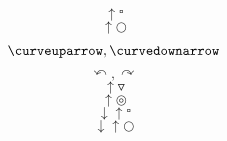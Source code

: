 \documentclass{jsarticle}
\begin{document}
\author{}
\date{}
\maketitle
 
   $$ \uparrow{\square} $$
   $$ \uparrow{\bigcirc}$$
   $$ \curveuparrow, \curvedownarrow $$
   $$ \curvearrowleft, \curvearrowright $$
   $$ \uparrow{\triangledown} $$
   $$ \uparrow{\circledcirc} $$
   $$ \downarrow{\uparrow{\square}} $$
   $$ \downarrow{\uparrow{\bigcirc}} $$
\end{document}
